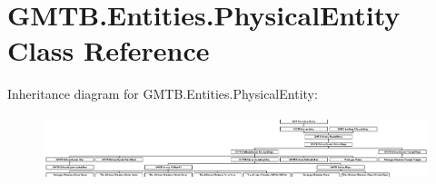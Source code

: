 \hypertarget{class_g_m_t_b_1_1_entities_1_1_physical_entity}{}\section{G\+M\+T\+B.\+Entities.\+Physical\+Entity Class Reference}
\label{class_g_m_t_b_1_1_entities_1_1_physical_entity}
Inheritance diagram for G\+M\+T\+B.\+Entities.\+Physical\+Entity\+:\begin{figure}[H]
\begin{center}
\leavevmode
\includegraphics[height=1.885522cm]{class_g_m_t_b_1_1_entities_1_1_physical_entity}
\end{center}
\end{figure}
